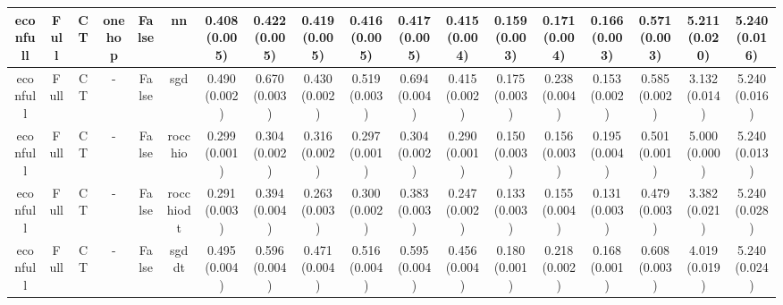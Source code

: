 \documentclass{article}
\begin{document}
{\begin{landscape}
\begin{table}[!h]
{\begin{tabular}{@{}cccccccccccccccccc@{}}
\midrule econfull & Full & CT & onehop & False & nn & 0.408 (0.005) & 0.422 (0.005) & 0.419 (0.005) & 0.416 (0.005) & 0.417 (0.005) & 0.415 (0.004) & 0.159 (0.003) & 0.171 (0.004) & 0.166 (0.003) &0.571 (0.003) & 5.211 (0.020) & 5.240 (0.016)\\
\midrule econfull & Full & CT & - & False & sgd & 0.490 (0.002) & 0.670 (0.003) & 0.430 (0.002) & 0.519 (0.003) & 0.694 (0.004) & 0.415 (0.002) & 0.175 (0.003) & 0.238 (0.004) & 0.153 (0.002) &0.585 (0.002) & 3.132 (0.014) & 5.240 (0.016)\\
\midrule econfull & Full & CT & - & False & rocchio & 0.299 (0.001) & 0.304 (0.002) & 0.316 (0.002) & 0.297 (0.001) & 0.304 (0.002) & 0.290 (0.001) & 0.150 (0.003) & 0.156 (0.003) & 0.195 (0.004) &0.501 (0.001) & 5.000 (0.000) & 5.240 (0.013)\\
\midrule econfull & Full & CT & - & False & rocchiodt & 0.291 (0.003) & 0.394 (0.004) & 0.263 (0.003) & 0.300 (0.002) & 0.383 (0.003) & 0.247 (0.002) & 0.133 (0.003) & 0.155 (0.004) & 0.131 (0.003) &0.479 (0.003) & 3.382 (0.021) & 5.240 (0.028)\\
\midrule econfull & Full & CT & - & False & sgddt & 0.495 (0.004) & 0.596 (0.004) & 0.471 (0.004) & 0.516 (0.004) & 0.595 (0.004) & 0.456 (0.004) & 0.180 (0.001) & 0.218 (0.002) & 0.168 (0.001) &0.608 (0.003) & 4.019 (0.019) & 5.240 (0.024)\\
                          \end{tabular}}
                          \end{table}
                          \begin{table}[!h]
                         \centering
\end{table}
\end{landscape}}
\end{document}
